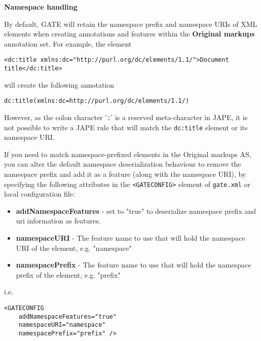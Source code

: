 \textbf{Namespace handling}

By default, GATE will retain the namespace prefix and namespace URIs of XML 
elements when creating annotations and features within the \textbf{Original markups} 
annotation set. For example, the element 
\begin{small}
\begin{verbatim}<dc:title xmlns:dc="http://purl.org/dc/elements/1.1/">Document title</dc:title>\end{verbatim}
\end{small}
will create the following annotation

\begin{small}
\begin{verbatim}dc:title(xmlns:dc=http://purl.org/dc/elements/1.1/)\end{verbatim}
\end{small}

However, as the colon character '{\tt :}' is a reserved meta-character in JAPE, it is
not possible to write a JAPE rule that will match the {\tt dc:title} element or its namespace URI.

If you need to match namespace-prefixed elements in the Original markups AS, you can
alter the default namespace deserialization behaviour to remove the namespace prefix and add it as a feature 
(along with the namespace URI), by specifying the following attributes in the {\tt<GATECONFIG>}
element of {\tt gate.xml} or local configuration file:


\begin{itemize}
\item \textbf{addNamespaceFeatures} - set to "true" to deserialize namespace prefix and uri information as features.
\item \textbf{namespaceURI} - The feature name to use that will hold the namespace URI of the element, e.g. "namespace"
\item \textbf{namespacePrefix} - The feature name to use that will hold the namespace prefix of the element, e.g. "prefix"
\end{itemize}
 
i.e.

\begin{small}
\begin{verbatim}<GATECONFIG 
	addNamespaceFeatures="true" 
	namespaceURI="namespace" 
	namespacePrefix="prefix" />\end{verbatim} 
\end{small}


